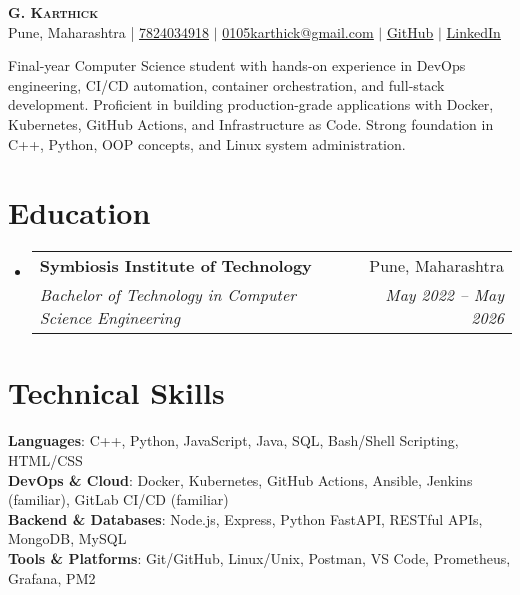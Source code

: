 \documentclass[letterpaper,11pt]{article}
\makeatletter
\newcommand{\resumeSubheading}[4]{
  \vspace{-2pt}\item
    \begin{tabular*}{0.97\textwidth}[t]{l@{\extracolsep{\fill}}r}
      \textbf{#1} & #2 \\
      \textit{\small#3} & \textit{\small #4} \\
    \end{tabular*}\vspace{-7pt}
}
\newcommand{\resumeSubHeadingListStart}{\begin{itemize}[leftmargin=0.15in, label={}]}
\newcommand{\resumeSubHeadingListEnd}{\end{itemize}}
\makeatother
\begin{document}
\begin{center}
    \textbf{\Huge \scshape G. Karthick} \\ \vspace{3pt}
    \small Pune, Maharashtra | 
    \href{tel:7824034918}{7824034918} $|$ 
    \href{mailto:0105karthick@gmail.com}{\underline{0105karthick@gmail.com}} $|$ 
    \href{https://github.com/G-karthick0501}{\underline{GitHub}} $|$
    \href{https://linkedin.com}{\underline{LinkedIn}}
\end{center}

\vspace{-8pt}
\begin{center}
    \small{Final-year Computer Science student with hands-on experience in DevOps engineering, CI/CD automation, container orchestration, and full-stack development. Proficient in building production-grade applications with Docker, Kubernetes, GitHub Actions, and Infrastructure as Code. Strong foundation in C++, Python, OOP concepts, and Linux system administration.}
\end{center}

\section{Education}
  \resumeSubHeadingListStart
    \resumeSubheading
      {Symbiosis Institute of Technology}{Pune, Maharashtra}
      {Bachelor of Technology in Computer Science Engineering}{May 2022 -- May 2026}
  \resumeSubHeadingListEnd

\section{Technical Skills}
 \begin{itemize}[leftmargin=0.15in, label={}]
    \small{\item{
     \textbf{Languages}{: C++, Python, JavaScript, Java, SQL, Bash/Shell Scripting, HTML/CSS} \\
     \textbf{DevOps \& Cloud}{: Docker, Kubernetes, GitHub Actions, Ansible, Jenkins (familiar), GitLab CI/CD (familiar)} \\
     \textbf{Backend \& Databases}{: Node.js, Express, Python FastAPI, RESTful APIs, MongoDB, MySQL} \\
     \textbf{Tools \& Platforms}{: Git/GitHub, Linux/Unix, Postman, VS Code, Prometheus, Grafana, PM2}
    }}
 \end{itemize}
\end{document}
